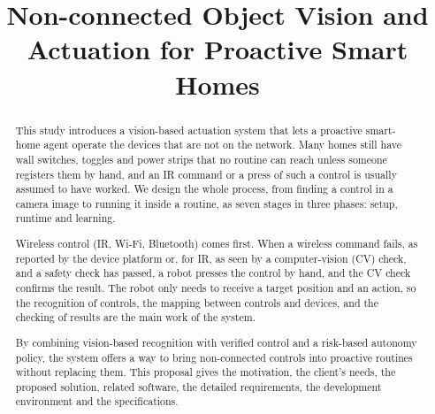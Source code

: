 \documentclass[conference]{IEEEtran}
\begin{document}
\title{Non-connected Object Vision and Actuation for Proactive Smart Homes}
\author{%
\and
{}
\and
{}
\and
{}
}

\maketitle

\begin{abstract}
This study introduces a vision-based actuation system that lets a proactive smart-home agent operate the devices that are not on the network. Many homes still have wall switches, toggles and power strips that no routine can reach unless someone registers them by hand, and an IR command or a press of such a control is usually assumed to have worked. We design the whole process, from finding a control in a camera image to running it inside a routine, as seven stages in three phases: setup, runtime and learning.

Wireless control (IR, Wi-Fi, Bluetooth) comes first. When a wireless command fails, as reported by the device platform or, for IR, as seen by a computer-vision (CV) check, and a safety check has passed, a robot presses the control by hand, and the CV check confirms the result. The robot only needs to receive a target position and an action, so the recognition of controls, the mapping between controls and devices, and the checking of results are the main work of the system.

By combining vision-based recognition with verified control and a risk-based autonomy policy, the system offers a way to bring non-connected controls into proactive routines without replacing them. This proposal gives the motivation, the client's needs, the proposed solution, related software, the detailed requirements, the development environment and the specifications.
\end{abstract}
\end{document}
